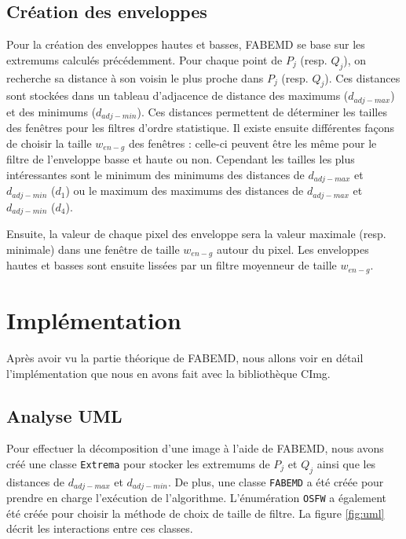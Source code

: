 \subsection{Création des enveloppes}
Pour la création des enveloppes hautes et basses, FABEMD se base sur les extremums calculés précédemment. Pour chaque point de $P_j$ (resp. $Q_j$), on recherche sa distance à son voisin le plus proche dans $P_j$ (resp. $Q_j$). Ces distances sont stockées dans un tableau d'adjacence de distance des maximums ($d_{adj-max}$) et des minimums ($d_{adj-min}$). Ces distances permettent de déterminer les tailles des fenêtres pour les filtres d'ordre statistique. Il existe ensuite différentes façons de choisir la taille $w_{en-g}$ des fenêtres : celle-ci peuvent être les même pour le filtre de l'enveloppe basse et haute ou non. Cependant les tailles les plus intéressantes sont le minimum des minimums des distances de $d_{adj-max}$ et $d_{adj-min}$ ($d_1$) ou le maximum des maximums des distances de $d_{adj-max}$ et $d_{adj-min}$ ($d_4$).

Ensuite, la valeur de chaque pixel des enveloppe sera la valeur maximale (resp. minimale) dans une fenêtre de taille $w_{en-g}$ autour du pixel. Les enveloppes hautes et basses sont ensuite lissées par un filtre moyenneur de taille $w_{en-g}$.

\section{Implémentation}
Après avoir vu la partie théorique de FABEMD, nous allons voir en détail l'implémentation que nous en avons fait avec la bibliothèque CImg.

\subsection{Analyse UML}
Pour effectuer la décomposition d'une image à l'aide de FABEMD, nous avons créé une classe \texttt{Extrema} pour stocker les extremums de $P_j$ et $Q_j$ ainsi que les distances de $d_{adj-max}$ et $d_{adj-min}$. De plus, une classe \texttt{FABEMD} a été créée pour prendre en charge l'exécution de l'algorithme. L'énumération \texttt{OSFW} a également été créée pour choisir la méthode de choix de taille de filtre. La figure \ref{fig:uml} décrit les interactions entre ces classes.


